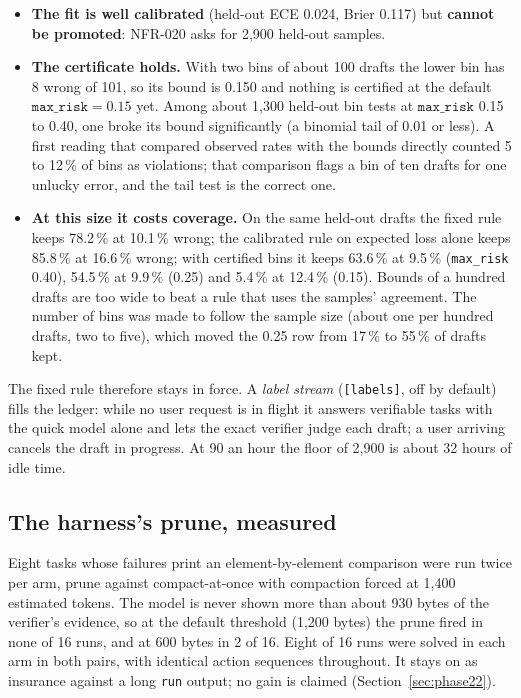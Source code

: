 \begin{itemize}
\item \textbf{The fit is well calibrated} (held-out ECE 0.024, Brier 0.117) but \textbf{cannot be promoted}: NFR-020 asks for 2,900 held-out samples.
\item \textbf{The certificate holds.} With two bins of about 100 drafts the lower bin has 8 wrong of 101, so its bound is 0.150 and nothing is certified at the
  default $\texttt{max\_risk}=0.15$ yet. Among about 1,300 held-out bin tests at $\texttt{max\_risk}$ 0.15 to 0.40, one broke its bound significantly (a
  binomial tail of 0.01 or less). A first reading that compared observed rates with the bounds directly counted 5 to 12\,\% of bins as violations; that
  comparison flags a bin of ten drafts for one unlucky error, and the tail test is the correct one.
\item \textbf{At this size it costs coverage.} On the same held-out drafts the fixed rule keeps 78.2\,\% at 10.1\,\% wrong; the calibrated rule on expected loss alone
  keeps 85.8\,\% at 16.6\,\% wrong; with certified bins it keeps 63.6\,\% at 9.5\,\% (\texttt{max\_risk} 0.40), 54.5\,\% at 9.9\,\% (0.25) and 5.4\,\% at 12.4\,\% (0.15).
  Bounds of a hundred drafts are too wide to beat a rule that uses the samples' agreement. The number of bins was made to follow the sample size (about one per
  hundred drafts, two to five), which moved the 0.25 row from 17\,\% to 55\,\% of drafts kept.
\end{itemize}

The fixed rule therefore stays in force. A \emph{label stream} (\texttt{[labels]}, off by default) fills the ledger: while no user request is in flight it
answers verifiable tasks with the quick model alone and lets the exact verifier judge each draft; a user arriving cancels the draft in progress. At 90 an hour
the floor of 2,900 is about 32 hours of idle time.

\subsection{The harness's prune, measured}

Eight tasks whose failures print an element-by-element comparison were run twice per arm, prune against compact-at-once with compaction forced at 1,400
estimated tokens. The model is never shown more than about 930 bytes of the verifier's evidence, so at the default threshold (1,200 bytes) the prune fired in
none of 16 runs, and at 600 bytes in 2 of 16. Eight of 16 runs were solved in each arm in both pairs, with identical action sequences throughout. It stays on as
insurance against a long \texttt{run} output; no gain is claimed (Section~\ref{sec:phase22}).


